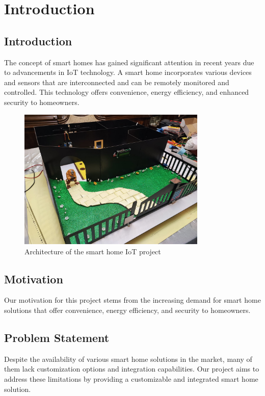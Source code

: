 \section{Introduction}
\subsection{Introduction}
The concept of smart homes has gained significant attention in recent years due to advancements in IoT technology. A smart home incorporates various devices and sensors that are interconnected and can be remotely monitored and controlled. This technology offers convenience, energy efficiency, and enhanced security to homeowners.

\begin{figure}[htbp]
    \centering
    \includegraphics[width=0.8\textwidth]{figs/Smarthome1.jpg}
    \caption{Architecture of the smart home IoT project}
    \label{fig:architecture}
\end{figure}

\subsection{Motivation}
Our motivation for this project stems from the increasing demand for smart home solutions that offer convenience, energy efficiency, and security to homeowners.

\subsection{Problem Statement}
Despite the availability of various smart home solutions in the market, many of them lack customization options and integration capabilities. Our project aims to address these limitations by providing a customizable and integrated smart home solution.

